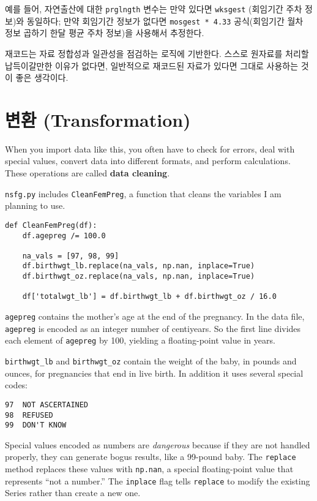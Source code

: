 예를 들어, 자연출산에 대한 {\tt prglngth} 변수는 만약 있다면 {\tt wksgest} (회임기간 주차 정보)와 동일하다; 만약 회임기간 정보가 없다면 {\tt mosgest * 4.33} 공식(회임기간 월차 정보 곱하기 한달 평균 주차 정보)을 사용해서 추정한다. 

재코드는 자료 정합성과 일관성을 점검하는 로직에 기반한다. 스스로 원자료를 처리할 납득이갈만한 이유가 없다면, 일반적으로 재코드된 자료가 있다면 그대로 사용하는 것이 좋은 생각이다. 

\section{변환 (Transformation)}
\label{cleaning}

When you import data like this, you often have to check for errors,
deal with special values, convert data into different formats, and
perform calculations.  These operations are called {\bf data cleaning}.

{\tt nsfg.py} includes {\tt CleanFemPreg}, a function that cleans
the variables I am planning to use.

\begin{verbatim}
def CleanFemPreg(df):
    df.agepreg /= 100.0

    na_vals = [97, 98, 99]
    df.birthwgt_lb.replace(na_vals, np.nan, inplace=True)
    df.birthwgt_oz.replace(na_vals, np.nan, inplace=True)

    df['totalwgt_lb'] = df.birthwgt_lb + df.birthwgt_oz / 16.0    
\end{verbatim}

{\tt agepreg} contains the mother's age at the end of the
pregnancy.  In the data file, {\tt agepreg} is encoded as an integer
number of centiyears.  So the first line divides each element
of {\tt agepreg} by 100, yielding a floating-point value in
years.

\verb"birthwgt_lb" and \verb"birthwgt_oz" contain the weight of the
baby, in pounds and ounces, for pregnancies that end in live birth.
In addition it uses several special codes:

\begin{verbatim}
97	NOT ASCERTAINED
98	REFUSED	 
99	DON'T KNOW
\end{verbatim}

Special values encoded as numbers are {\em dangerous} because if they
are not handled properly, they can generate bogus results, like
a 99-pound baby.  The {\tt replace} method replaces these values with
{\tt np.nan}, a special floating-point value that represents ``not a
number.''  The {\tt inplace} flag tells {\tt replace} to modify the
existing Series rather than create a new one.

